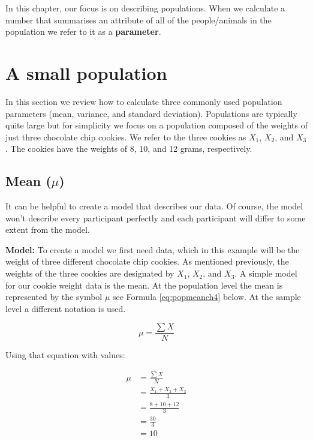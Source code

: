 \documentclass[
]{krantz}
\begin{document}
In this chapter, our focus is on describing populations. When we calculate a number that summarises an attribute of all of the people/animals in the population we refer to it as a \textbf{parameter}.

\hypertarget{a-small-population}{%
\section{A small population}\label{a-small-population}}

In this section we review how to calculate three commonly used population parameters (mean, variance, and standard deviation). Populations are typically quite large but for simplicity we focus on a population composed of the weights of just three chocolate chip cookies. We refer to the three cookies as \(X_1\), \(X_2\), and \(X_3\). The cookies have the weights of 8, 10, and 12 grams, respectively.

\hypertarget{mean-mu}{%
\subsection{\texorpdfstring{Mean (\(\mu\))}{Mean (\textbackslash mu)}}\label{mean-mu}}

It can be helpful to create a model that describes our data. Of course, the model won't describe every participant perfectly and each participant will differ to some extent from the model.

\textbf{Model:} To create a model we first need data, which in this example will be the weight of three different chocolate chip cookies. As mentioned previously, the weights of the three cookies are designated by \(X_1\), \(X_2\), and \(X_3\). A simple model for our cookie weight data is the mean. At the population level the mean is represented by the symbol \(\mu\) see Formula \eqref{eq:popmeanch4} below. At the sample level a different notation is used.

\begin{equation} 
\mu = \frac{\sum{X}}{N}
      \label{eq:popmeanch4}
\end{equation}

Using that equation with values:

\[
\begin{aligned} 
\mu &= \frac{\sum{X}}{N} \\
&= \frac{X_1 + X_2 + X_3}{3}\\ 
&= \frac{8 + 10 + 12}{3}\\
&= \frac{30}{3}\\
&= 10\\
\end{aligned} 
\]
\end{document}
